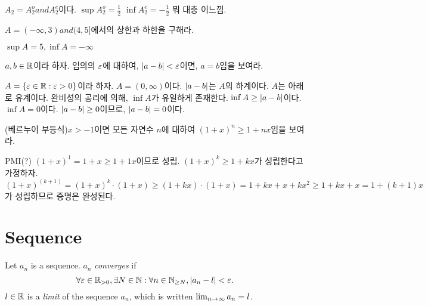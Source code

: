 \begin{exercise}

\end{exercise}

\begin{solution}
  $A_2 = A_2^o and A_2^e$이다.
  $\sup A_2^o = \frac{1}{2}$
  $\inf A_2^e = -\frac{1}{2}$ 뭐 대충 이느낌.
\end{solution}

\begin{exercise}
  $A = (-\infty, 3) and (4, 5]$에서의 상한과 하한을 구해라.
\end{exercise}

\begin{solution}
  $\sup A = 5, \inf A  = -\infty$
\end{solution}

\begin{exercise}
  $a, b \in \mathbb{R}$이라 하자. 임의의 $\varepsilon$에 대하여, $\left| a-b \right| < \varepsilon$이면, $a = b$임을 보여라.
\end{exercise}

\begin{solution}
  $A = \{\varepsilon \in \mathbb{R} : \varepsilon > 0\}$이라 하자. $A = (0, \infty)$이다.
  $\left| a - b \right|$는 $A$의 하계이다. $A$는 아래로 유계이다.
  완비성의 공리에 의해, $\inf A$가 유일하게 존재한다. $\inf A \ge \left| a - b \right|$이다.
  $\inf A = 0$이다. $\left| a - b \right| \ge 0$이므로, $\left| a - b \right| = 0$이다.
\end{solution}

\begin{exercise}
  (베르누이 부등식)$x > -1$이면 모든 자연수 $n$에 대하여 $(1 + x)^n \ge 1 + nx$임을 보여라.
\end{exercise}

\begin{solution}
  PMI(?) $(1 + x)^1 = 1 + x \ge 1 + 1x$이므로 성립.
  $(1 + x)^k \ge 1 + kx$가 성립한다고 가정하자.
  $(1 + x)^(k+1) = (1 + x)^k \cdot (1 + x) \ge (1 + kx) \cdot (1 + x)
    = 1 + kx + x + kx^2 \ge 1 + kx + x = 1 + (k + 1)x$가 성립하므로 증명은 완성된다.
\end{solution}

\section{Sequence}

\begin{definition}
  Let $a_n$ is a sequence. $a_n$ \emph{converges} if
  \begin{equation}
    \forall \varepsilon \in \mathbb{R}_{> 0}, \exists N \in \mathbb{N}: \forall n \in \mathbb{N}_{\ge N}, \left| a_n - l \right| < \varepsilon.
  \end{equation}
  $l \in \mathbb{R}$ is a \emph{limit} of the sequence $a_n$, which is written $\lim_{n \to \infty}
    a_n = l$.
  \label{def:lim}
\end{definition}

